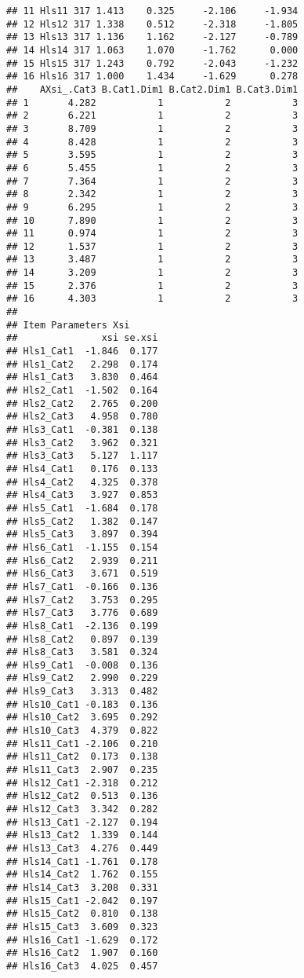 \documentclass[
]{book}
\begin{document}
\begin{verbatim}
## 11 Hls11 317 1.413    0.325     -2.106     -1.934
## 12 Hls12 317 1.338    0.512     -2.318     -1.805
## 13 Hls13 317 1.136    1.162     -2.127     -0.789
## 14 Hls14 317 1.063    1.070     -1.762      0.000
## 15 Hls15 317 1.243    0.792     -2.043     -1.232
## 16 Hls16 317 1.000    1.434     -1.629      0.278
##    AXsi_.Cat3 B.Cat1.Dim1 B.Cat2.Dim1 B.Cat3.Dim1
## 1       4.282           1           2           3
## 2       6.221           1           2           3
## 3       8.709           1           2           3
## 4       8.428           1           2           3
## 5       3.595           1           2           3
## 6       5.455           1           2           3
## 7       7.364           1           2           3
## 8       2.342           1           2           3
## 9       6.295           1           2           3
## 10      7.890           1           2           3
## 11      0.974           1           2           3
## 12      1.537           1           2           3
## 13      3.487           1           2           3
## 14      3.209           1           2           3
## 15      2.376           1           2           3
## 16      4.303           1           2           3
## 
## Item Parameters Xsi
##               xsi se.xsi
## Hls1_Cat1  -1.846  0.177
## Hls1_Cat2   2.298  0.174
## Hls1_Cat3   3.830  0.464
## Hls2_Cat1  -1.502  0.164
## Hls2_Cat2   2.765  0.200
## Hls2_Cat3   4.958  0.780
## Hls3_Cat1  -0.381  0.138
## Hls3_Cat2   3.962  0.321
## Hls3_Cat3   5.127  1.117
## Hls4_Cat1   0.176  0.133
## Hls4_Cat2   4.325  0.378
## Hls4_Cat3   3.927  0.853
## Hls5_Cat1  -1.684  0.178
## Hls5_Cat2   1.382  0.147
## Hls5_Cat3   3.897  0.394
## Hls6_Cat1  -1.155  0.154
## Hls6_Cat2   2.939  0.211
## Hls6_Cat3   3.671  0.519
## Hls7_Cat1  -0.166  0.136
## Hls7_Cat2   3.753  0.295
## Hls7_Cat3   3.776  0.689
## Hls8_Cat1  -2.136  0.199
## Hls8_Cat2   0.897  0.139
## Hls8_Cat3   3.581  0.324
## Hls9_Cat1  -0.008  0.136
## Hls9_Cat2   2.990  0.229
## Hls9_Cat3   3.313  0.482
## Hls10_Cat1 -0.183  0.136
## Hls10_Cat2  3.695  0.292
## Hls10_Cat3  4.379  0.822
## Hls11_Cat1 -2.106  0.210
## Hls11_Cat2  0.173  0.138
## Hls11_Cat3  2.907  0.235
## Hls12_Cat1 -2.318  0.212
## Hls12_Cat2  0.513  0.136
## Hls12_Cat3  3.342  0.282
## Hls13_Cat1 -2.127  0.194
## Hls13_Cat2  1.339  0.144
## Hls13_Cat3  4.276  0.449
## Hls14_Cat1 -1.761  0.178
## Hls14_Cat2  1.762  0.155
## Hls14_Cat3  3.208  0.331
## Hls15_Cat1 -2.042  0.197
## Hls15_Cat2  0.810  0.138
## Hls15_Cat3  3.609  0.323
## Hls16_Cat1 -1.629  0.172
## Hls16_Cat2  1.907  0.160
## Hls16_Cat3  4.025  0.457

\end{verbatim}
\end{document}
